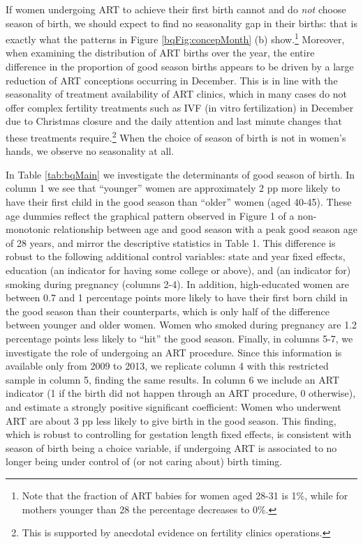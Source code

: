 \documentclass[a4paper, 12 pt]{article}
\theoremstyle{plain}
\begin{document}
\begin{doublespace}
If women undergoing ART to achieve their first birth cannot and do \emph{not} choose season of birth, we should expect to find no seasonality gap in their births: that is exactly what the patterns in Figure \ref{bqFig:concepMonth} (b) show.\footnote{Note that the fraction of ART babies for women aged 28-31 is 1\%, while for mothers younger than 28 the percentage decreases to 0\%.} Moreover, when examining the distribution of ART births over the year, the entire difference in the proportion of good season births appears to be driven by a large reduction of ART conceptions occurring in December. This is in line with the seasonality of treatment availability of ART clinics, which in many cases do not offer complex fertility treatments such as IVF (in vitro fertilization) in December due to Christmas closure and the daily attention and last minute changes that these treatments require.\footnote{ This is supported by anecdotal evidence on fertility clinics operations.} When the choice of season of birth is not in women's hands, we observe no seasonality at all.

In Table \ref{tab:bqMain} we investigate the determinants of good season of birth. In column 1 we see that ``younger'' women are approximately 2 pp more likely to have their first child in the good season than ``older'' women (aged 40-45). These age dummies reflect the graphical pattern observed in Figure 1 of a non-monotonic relationship between age and good season with a peak good season age of 28 years, and mirror the descriptive statistics in Table 1. This difference is robust to the following additional control variables: state and year fixed effects, education (an indicator for having some college or above), and (an indicator for) smoking during pregnancy (columns 2-4). In addition, high-educated women are between 0.7 and 1 percentage points more likely to have their first born child in the good season than their counterparts, which is only half of the difference between younger and older women. Women who smoked during pregnancy are 1.2 percentage points less likely to ``hit'' the good season. %
Finally, in columns 5-7, we investigate the role of undergoing an ART procedure. Since this information is available only from 2009 to 2013, we replicate column 4 with this restricted sample in column 5, finding the same results. In column 6 we include an ART indicator (1 if the birth did not happen through an ART procedure, 0 otherwise), and estimate a strongly positive significant coefficient: Women who underwent ART are about 3 pp less likely to give birth in the good season. This finding, which is robust to controlling for gestation length fixed effects, is consistent with season of birth being a choice variable, if undergoing ART is associated to no longer being under control of (or not caring about) birth timing.


\end{doublespace}
\end{document}
